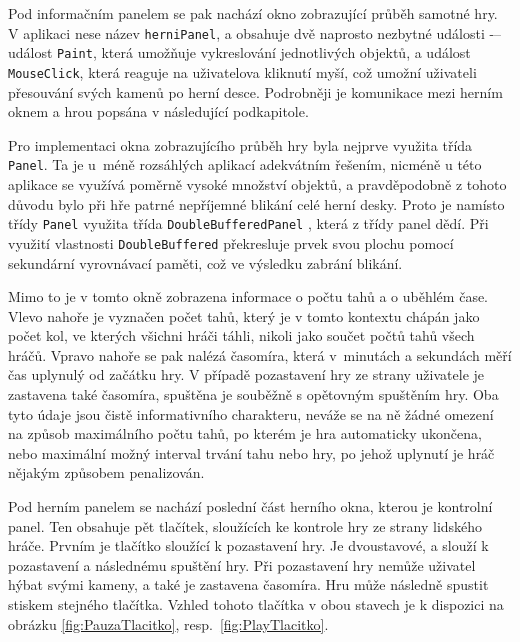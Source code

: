 Pod informačním panelem se pak nachází okno zobrazující průběh samotné hry. V aplikaci nese název \lstinline$herniPanel$, a obsahuje dvě naprosto nezbytné události -– událost \lstinline$Paint$, která umožňuje vykreslování jednotlivých objektů, a událost \lstinline$MouseClick$, která reaguje na uživatelova kliknutí myší, což umožní uživateli přesouvání svých kamenů po herní desce. Podrobněji je komunikace mezi herním oknem a hrou popsána v následující podkapitole.

Pro implementaci okna zobrazujícího průběh hry byla nejprve využita třída \lstinline$Panel$. Ta je u~méně rozsáhlých aplikací adekvátním řešením, nicméně u této aplikace se využívá poměrně vysoké množství objektů, a pravděpodobně z tohoto důvodu bylo při hře patrné nepříjemné blikání celé herní desky. Proto je namísto třídy \lstinline$Panel$ využita třída \lstinline$DoubleBufferedPanel$ \cite{doublebuffered}, která z třídy panel dědí. Při využití vlastnosti \lstinline$DoubleBuffered$ překresluje prvek svou plochu pomocí sekundární vyrovnávací paměti, což ve výsledku zabrání blikání.

Mimo to je v tomto okně zobrazena informace o počtu tahů a o uběhlém čase. Vlevo nahoře je vyznačen počet tahů, který je v tomto kontextu chápán jako počet kol, ve kterých všichni hráči táhli, nikoli jako součet počtů tahů všech hráčů. Vpravo nahoře se pak nalézá časomíra, která v~minutách a sekundách měří čas uplynulý od začátku hry. V případě pozastavení hry ze strany uživatele je zastavena také časomíra, spuštěna je souběžně s opětovným spuštěním hry. Oba tyto údaje jsou čistě informativního charakteru, neváže se na ně žádné omezení na způsob maximálního počtu tahů, po kterém je hra automaticky ukončena, nebo maximální možný interval trvání tahu nebo hry, po jehož uplynutí je hráč nějakým způsobem penalizován.

Pod herním panelem se nachází poslední část herního okna, kterou je kontrolní panel. Ten obsahuje pět tlačítek, sloužících ke kontrole hry ze strany lidského hráče. Prvním je tlačítko sloužící k pozastavení hry. Je dvoustavové, a slouží k pozastavení a následnému spuštění hry. Při pozastavení hry nemůže uživatel hýbat svými kameny, a také je zastavena časomíra. Hru může následně spustit stiskem stejného tlačítka. Vzhled tohoto tlačítka v obou stavech je k dispozici na obrázku \ref{fig:PauzaTlacitko}, resp.~\ref{fig:PlayTlacitko}.

